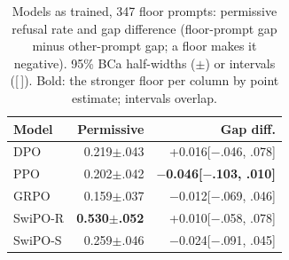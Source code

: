 \ifvenueMath\else\ifvenueBench\else\ifvenueLoyal\else\begin{table}[t]  %
\centering
\footnotesize
\setlength{\tabcolsep}{2.5pt}
\ifvenueLoyal  %
\begin{tabular}{lrr}
\toprule
Model & Permissive & Gap diff. \\
\midrule
DPO & 0.219{\tiny$\pm$.043} & +0.016{\tiny[$-$.046, .078]} \\
PPO & 0.202{\tiny$\pm$.042} & \textbf{$-$0.046{\tiny[$-$.103, .010]}} \\
GRPO & 0.159{\tiny$\pm$.037} & $-$0.012{\tiny[$-$.069, .046]} \\
\mbox{SwiPO-R} & \textbf{0.530{\tiny$\pm$.052}} & +0.010{\tiny[$-$.058, .078]} \\
\mbox{SwiPO-S} & 0.259{\tiny$\pm$.046} & $-$0.024{\tiny[$-$.091, .045]} \\
\bottomrule
\end{tabular}
\caption{Models as trained, 347 floor prompts: permissive refusal rate and gap difference (floor-prompt gap minus other-prompt gap; a floor makes it negative). 95\% BCa half-widths ($\pm$) or intervals ([\,]). Bold: the stronger floor per column by point estimate; intervals overlap.}
\else
\setlength{\tabcolsep}{1.6pt}
\end{table}
